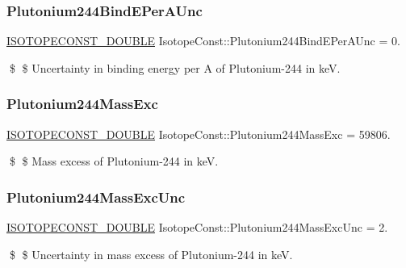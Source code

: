 \subsubsection{\texorpdfstring{Plutonium244\+Bind\+E\+Per\+A\+Unc}{Plutonium244BindEPerAUnc}}
{\footnotesize\ttfamily \mbox{\hyperlink{group___isotope_const-_macros_ga8f45a7272ce02c0b4c65c44636ed719a}{I\+S\+O\+T\+O\+P\+E\+C\+O\+N\+S\+T\+\_\+\+D\+O\+U\+B\+LE}} Isotope\+Const\+::\+Plutonium244\+Bind\+E\+Per\+A\+Unc = 0.}

\$ \$ Uncertainty in binding energy per A of Plutonium-\/244 in keV. \mbox{\label{group___isotope_const-_plutonium-_pu244_gaa27373f8cb68a77a6dccf4d6b11c63ef}} 
\subsubsection{\texorpdfstring{Plutonium244\+Mass\+Exc}{Plutonium244MassExc}}
{\footnotesize\ttfamily \mbox{\hyperlink{group___isotope_const-_macros_ga8f45a7272ce02c0b4c65c44636ed719a}{I\+S\+O\+T\+O\+P\+E\+C\+O\+N\+S\+T\+\_\+\+D\+O\+U\+B\+LE}} Isotope\+Const\+::\+Plutonium244\+Mass\+Exc = 59806.}

\$ \$ Mass excess of Plutonium-\/244 in keV. \mbox{\label{group___isotope_const-_plutonium-_pu244_gaf1051c4b55d24651a0d85c3003b601ad}} 
\subsubsection{\texorpdfstring{Plutonium244\+Mass\+Exc\+Unc}{Plutonium244MassExcUnc}}
{\footnotesize\ttfamily \mbox{\hyperlink{group___isotope_const-_macros_ga8f45a7272ce02c0b4c65c44636ed719a}{I\+S\+O\+T\+O\+P\+E\+C\+O\+N\+S\+T\+\_\+\+D\+O\+U\+B\+LE}} Isotope\+Const\+::\+Plutonium244\+Mass\+Exc\+Unc = 2.}

\$ \$ Uncertainty in mass excess of Plutonium-\/244 in keV. \mbox{\label{group___isotope_const-_plutonium-_pu244_gae983817ecb52061ff706d189ea3bfec6}} 
